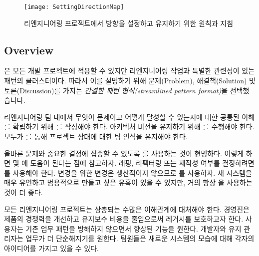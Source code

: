 \documentclass[a4paper,10pt,twoside]{book}
\begin{document}
\begin{figure}
\begin{center}
\texttt{[image: SettingDirectionMap]}
\caption{리엔지니어링 프로젝트에서 방향을 설정하고 유지하기 위한 원칙과 지침}
\end{center}
\end{figure}

\subsection*{Overview}

은 모든 개발 프로젝트에 적용할 수 있지만 리엔지니어링 작업과 특별한 관련성이 있는 패턴의 클러스터이다. 따라서 이를 설명하기 위해 문제(Problem), 해결책(Solution) 및 토론(Discussion)를 가지는 \emph{간결한 패턴 형식(streamlined pattern format)}을 선택했습니다.

리엔지니어링 팀 내에서 무엇이 문제이고 어떻게 달성할 수 있는지에 대한 공통된 이해를 확립하기 위해 를 작성해야 한다. 아키텍처 비전을 유지하기 위해 를 수행해야 한다. 모두가 를 통해 프로젝트 상태에 대한 팀 인식을 유지해야 한다.

올바른 문제와 중요한 결정에 집중할 수 있도록 를 사용하는 것이 현명하다. 이렇게 하면  및 에 도움이 된다는 점에 참고하자. 래핑, 리팩터링 또는 재작성 여부를 결정하려면 를 사용해야 한다. 변경을 위한 변경은 생산적이지 않으므로 를 사용하자. 새 시스템을 매우 유연하고 범용적으로 만들고 싶은 유혹이 있을 수 있지만, 거의 항상 을 사용하는 것이 더 좋다.




\discussion
모든 리엔지니어링 프로젝트는 상충되는 수많은 이해관계에 대처해야 한다. 경영진은 제품의 경쟁력을 개선하고 유지보수 비용을 줄임으로써 레거시를 보호하고자 한다. 사용자는 기존 업무 패턴을 방해하지 않으면서 향상된 기능을 원한다. 개발자와 유지 관리자는 업무가 더 단순해지기를 원한다. 팀원들은 새로운 시스템의 모습에 대해 각자의 아이디어를 가지고 있을 수 있다.
\end{document}
